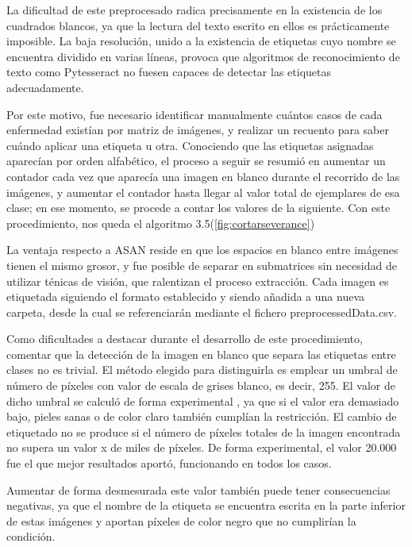  La dificultad de este preprocesado radica precisamente en la existencia de los cuadrados blancos, ya que la lectura del texto escrito en ellos es prácticamente imposible. La baja resolución, unido a la existencia de etiquetas cuyo nombre se encuentra dividido en varias líneas, provoca que algoritmos de reconocimiento de texto como Pytesseract \cite {pytesseract} no fuesen capaces de detectar las etiquetas adecuadamente.
 
 Por este motivo, fue necesario identificar manualmente cuántos casos de cada enfermedad existían por matriz de imágenes, y realizar un recuento para saber cuándo aplicar una etiqueta u otra. Conociendo que las etiquetas asignadas aparecían por orden alfabético, el proceso a seguir se resumió en aumentar un contador cada vez que aparecía una imagen en blanco durante el recorrido de las imágenes, y aumentar el contador hasta llegar al valor total de ejemplares de esa clase; en ese momento, se procede a contar los valores de la siguiente. Con este procedimiento, nos queda el algoritmo 3.5(\ref{fig:cortarseverance})
  
La ventaja respecto a ASAN reside en que los espacios en blanco entre imágenes tienen el mismo grosor, y fue posible de separar en submatrices sin necesidad de utilizar ténicas de visión, que ralentizan el proceso extracción. Cada imagen es etiquetada siguiendo el formato establecido  y siendo añadida a una nueva carpeta, desde la cual se referenciarán mediante el fichero preprocessedData.csv. 

Como dificultades a destacar durante el desarrollo de este procedimiento, comentar que la detección de la imagen en blanco que separa las etiquetas entre clases no es trivial. El método elegido para distinguirla es emplear un  umbral de número de píxeles con valor de escala de grises blanco, es decir, 255. El valor de dicho umbral se calculó de forma experimental , ya que si el valor era demasiado bajo, pieles sanas o de color claro también cumplían la restricción. El cambio de etiquetado no se produce si el número de píxeles totales de la imagen encontrada no supera un valor x de miles de píxeles. De forma experimental, el valor 20.000 fue el que mejor resultados aportó, funcionando en todos los casos.

Aumentar de forma desmesurada este valor también puede tener consecuencias negativas, ya que el nombre de la etiqueta se encuentra escrita en la parte inferior de estas imágenes y aportan píxeles de color negro que no cumplirían la condición.



